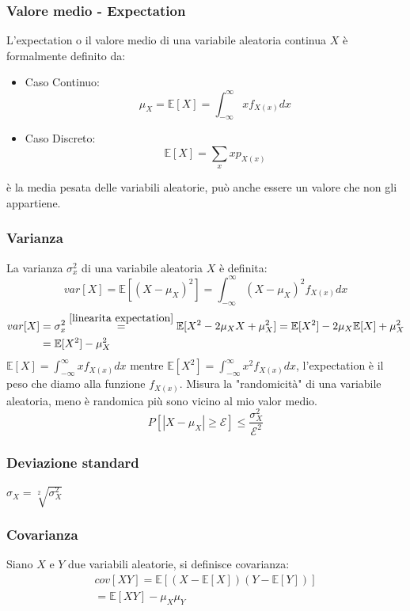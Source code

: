         \subsubsection{Valore medio - Expectation}
            L'expectation o il valore medio di una variabile aleatoria continua $X$ è formalmente definito da:
            \begin{itemize}
                \item {Caso Continuo:
                    \[
                        \mu_X = \mathbb{E}[X] = \int_{-\infty}^{\infty} xf_{X(x)}dx
                    \]
                }
                \item {Caso Discreto:
                    \[
                        \mathbb{E}[X] = \sum_{x}xp_{X(x)}
                    \]
                }
            \end{itemize}
            è la media pesata delle variabili aleatorie, può anche essere un valore che non gli appartiene.
        \subsubsection{Varianza}
            La varianza $\sigma^2_x$ di una variabile aleatoria $X$ è definita:
            \[
                var[X] = \mathbb{E}[(X-\mu_X)^2] = \int_{-\infty}^{\infty} (X-\mu_X)^2f_{X(x)}dx
            \]  
            \begin{align}
                var[X] &= \sigma^2_x \overset{\ref{linearita expectation}}{=} \mathbb{E}[X^2-2\mu_XX+\mu_X^2] = \mathbb{E}[X^2]-2\mu_X\mathbb{E}[X]+\mu_X^2 \nonumber \\
                        &= \mathbb{E}[X^2]-\mu_X^2 \nonumber 
            \end{align}
            $\mathbb{E}[X] = \int_{-\infty}^{\infty} xf_{X(x)}dx$ mentre $\mathbb{E}[X^2] = \int_{-\infty}^{\infty} x^2f_{X(x)}dx$, l'expectation è il peso che diamo alla funzione $f_{X(x)}$.  
            Misura la "randomicità" di una variabile aleatoria, meno è randomica più sono vicino al mio valor medio.
            \[
                P[|X-\mu_X|\geq \mathcal{E}]\leq \frac{\sigma^2_X}{\mathcal{E}^2}
            \]
        \subsubsection{Deviazione standard}
            $\sigma_X = \sqrt[2]{\sigma^2_X}$
        \subsubsection{Covarianza}  
            Siano $X$ e $Y$ due variabili aleatorie, si definisce covarianza:
            \begin{gather}
                cov[XY] = \mathbb{E}[(X-\mathbb{E}[X])(Y-\mathbb{E}[Y])]\nonumber\\
                = \mathbb{E}[XY]-\mu_X\mu_Y\nonumber
            \end{gather}

